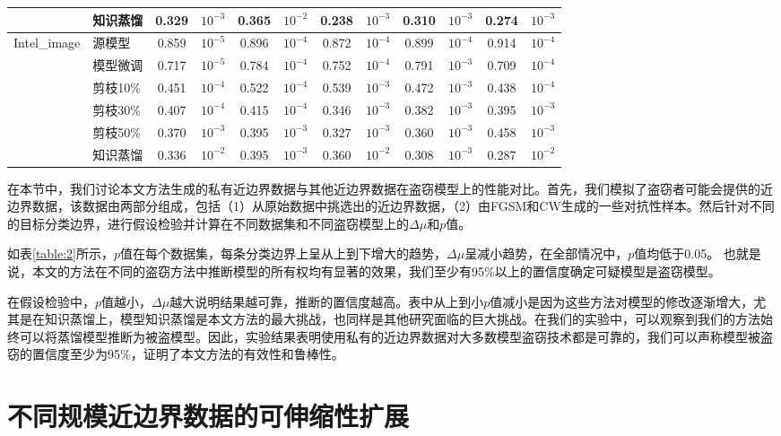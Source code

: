\begin{table}[h]
{\begin{tabular}{l l c c c c c c c c c c}
								&知识蒸馏  & 0.329 & $10^{-3}$ & 0.365 & $10^{-2}$ & 0.238 & $10^{-3}$ & 0.310 & $10^{-3}$ & 0.274 & $10^{-3}$   \\
		\hline
\multirow{6}{5em}{Intel\_image} &源模型    & 0.859 & $10^{-5}$ & 0.896 & $10^{-4}$ & 0.872 & $10^{-4}$ & 0.899 & $10^{-4}$ & 0.914 & $10^{-4}$   \\
								&模型微调  & 0.717 & $10^{-5}$ & 0.784 & $10^{-4}$ & 0.752 & $10^{-4}$ & 0.791 & $10^{-3}$ & 0.709 & $10^{-4}$   \\
								&剪枝10\%  & 0.451 & $10^{-4}$ & 0.522 & $10^{-4}$ & 0.539 & $10^{-3}$ & 0.472 & $10^{-3}$ & 0.438 & $10^{-4}$   \\
								&剪枝30\%  & 0.407 & $10^{-4}$ & 0.415 & $10^{-4}$ & 0.346 & $10^{-3}$ & 0.382 & $10^{-3}$ & 0.395 & $10^{-3}$   \\
								&剪枝50\%  & 0.370 & $10^{-3}$ & 0.395 & $10^{-3}$ & 0.327 & $10^{-3}$ & 0.360 & $10^{-3}$ & 0.458 & $10^{-3}$   \\
								&知识蒸馏  & 0.336 & $10^{-2}$ & 0.395 & $10^{-3}$ & 0.360 & $10^{-2}$ & 0.308 & $10^{-3}$ & 0.287 & $10^{-2}$   \\
		\hline		
	\end{tabular}
}
\end{table}

在本节中，我们讨论本文方法生成的私有近边界数据与其他近边界数据在盗窃模型上的性能对比。首先，我们模拟了盗窃者可能会提供的近边界数据，该数据由两部分组成，包括（1）从原始数据中挑选出的近边界数据，（2）由FGSM和CW生成的一些对抗性样本。然后针对不同的目标分类边界，进行假设检验并计算在不同数据集和不同盗窃模型上的$\Delta\mu$和$p$值。

如表\ref{table:2}所示，$p$值在每个数据集，每条分类边界上呈从上到下增大的趋势，$\Delta\mu$呈减小趋势，在全部情况中，$p$值均低于0.05。
也就是说，本文的方法在不同的盗窃方法中推断模型的所有权均有显著的效果，我们至少有95\%以上的置信度确定可疑模型是盗窃模型。

在假设检验中，$p$值越小，$\Delta\mu$越大说明结果越可靠，推断的置信度越高。表中从上到小$p$值减小是因为这些方法对模型的修改逐渐增大，尤其是在知识蒸馏上，模型知识蒸馏是本文方法的最大挑战，也同样是其他研究面临的巨大挑战。在我们的实验中，可以观察到我们的方法始终可以将蒸馏模型推断为被盗模型。因此，实验结果表明使用私有的近边界数据对大多数模型盗窃技术都是可靠的，我们可以声称模型被盗窃的置信度至少为95\%，证明了本文方法的有效性和鲁棒性。


\section{不同规模近边界数据的可伸缩性扩展}\label{5.6}

